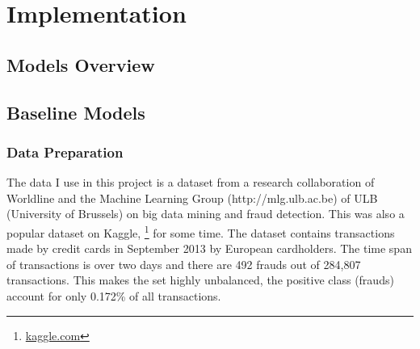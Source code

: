 \documentclass[12pt,a4paper,twoside]{report}
\let\oldfootnote\footnote
\renewcommand\footnote[1]{%
\oldfootnote{\hspace{2mm}#1}}
\begin{document}
\chapter{Implementation}
\section{Models Overview}

\begin{table}[H]
\begin{center}
\end{center}
\caption{High level overview of the models. }
\label{fig:models-overview}
\end{table}

\section{Baseline Models}
\subsection{Data Preparation}

The data I use in this project is a dataset from a research collaboration of Worldline and the Machine Learning Group (http://mlg.ulb.ac.be) of ULB (University of Brussels) on big data mining and fraud detection. This was also a popular dataset on Kaggle,\footnote{\href{kaggle.com}{kaggle.com}} for some time.
The dataset contains transactions made by credit cards in September 2013 by European cardholders. The time span of transactions is over two days and there are 492 frauds out of 284,807 transactions. This makes the set highly unbalanced, the positive class (frauds) account for only 0.172\% of all transactions.
 
\end{document}
